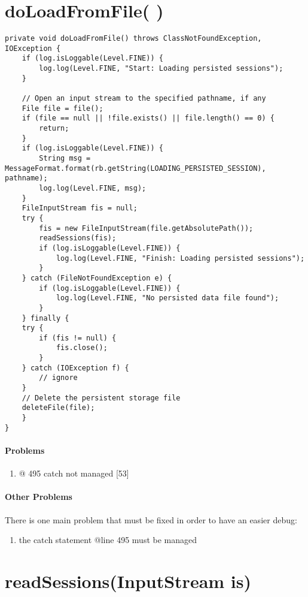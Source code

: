 
\section*{doLoadFromFile( )}

\lstset{firstnumber=465}
\begin{lstlisting}
private void doLoadFromFile() throws ClassNotFoundException, IOException {
	if (log.isLoggable(Level.FINE)) {
		log.log(Level.FINE, "Start: Loading persisted sessions");
	}

	// Open an input stream to the specified pathname, if any
	File file = file();
	if (file == null || !file.exists() || file.length() == 0) {
		return;
	}
	if (log.isLoggable(Level.FINE)) {
		String msg = MessageFormat.format(rb.getString(LOADING_PERSISTED_SESSION), pathname);
		log.log(Level.FINE, msg);
	}
	FileInputStream fis = null;
	try {
		fis = new FileInputStream(file.getAbsolutePath());
		readSessions(fis);
		if (log.isLoggable(Level.FINE)) {
			log.log(Level.FINE, "Finish: Loading persisted sessions");
		}
	} catch (FileNotFoundException e) {
		if (log.isLoggable(Level.FINE)) {
			log.log(Level.FINE, "No persisted data file found");
		}
	} finally {
	try {
		if (fis != null) {
			fis.close();
		}
	} catch (IOException f) {
		// ignore
	}
	// Delete the persistent storage file
	deleteFile(file);
	}
}

\end{lstlisting}

\paragraph{Problems}
\begin{enumerate}
	\item @ 495 catch not managed [53]
\end{enumerate}

\paragraph{Other Problems}
There is one main problem that must be fixed in order to have an easier debug:

\begin{enumerate}
	\item the catch statement @line 495 must be managed
\end{enumerate}


\section*{readSessions(InputStream is)}



